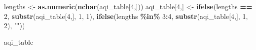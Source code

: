 \documentclass[
]{article}
\newenvironment{Shaded}{\begin{snugshade}}{\end{snugshade}}
\newcommand{\DecValTok}[1]{\textcolor[rgb]{0.00,0.00,0.81}{#1}}
\newcommand{\FunctionTok}[1]{\textcolor[rgb]{0.13,0.29,0.53}{\textbf{#1}}}
\newcommand{\NormalTok}[1]{#1}
\newcommand{\OtherTok}[1]{\textcolor[rgb]{0.56,0.35,0.01}{#1}}
\newcommand{\SpecialCharTok}[1]{\textcolor[rgb]{0.81,0.36,0.00}{\textbf{#1}}}
\newcommand{\StringTok}[1]{\textcolor[rgb]{0.31,0.60,0.02}{#1}}
\begin{document}
\begin{Shaded}
\begin{Highlighting}[]
\NormalTok{lengths }\OtherTok{\textless{}{-}} \FunctionTok{as.numeric}\NormalTok{(}\FunctionTok{nchar}\NormalTok{(aqi\_table[}\DecValTok{4}\NormalTok{,]))}
\NormalTok{aqi\_table[}\DecValTok{4}\NormalTok{,] }\OtherTok{\textless{}{-}} \FunctionTok{ifelse}\NormalTok{(lengths }\SpecialCharTok{==} \DecValTok{2}\NormalTok{, }\FunctionTok{substr}\NormalTok{(aqi\_table[}\DecValTok{4}\NormalTok{,], }\DecValTok{1}\NormalTok{, }\DecValTok{1}\NormalTok{), }\FunctionTok{ifelse}\NormalTok{(lengths }\SpecialCharTok{\%in\%} \DecValTok{3}\SpecialCharTok{:}\DecValTok{4}\NormalTok{, }\FunctionTok{substr}\NormalTok{(aqi\_table[}\DecValTok{4}\NormalTok{,], }\DecValTok{1}\NormalTok{, }\DecValTok{2}\NormalTok{), }\StringTok{""}\NormalTok{))}

\NormalTok{aqi\_table}
\end{Highlighting}
\end{Shaded}
\end{document}
